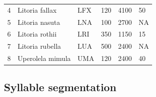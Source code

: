 \begin{table}[htb!]
{\begin{tabular}{llllll}
4            & Litoria fallax              & LFX                   & 120                                                                                 & 4100                                                                   & 50                                                                                   \\ 
5            & Litoria nasuta              & LNA                   & 100                                                                                 & 2700                                                                   & NA                                                                                   \\ 
6            & Litoria rothii              & LRI                   & 350                                                                                 & 1150                                                                   & 15                                                                                   \\ 
7            & Litoria rubella             & LUA                   & 500                                                                                 & 2400                                                                   & NA                                                                                   \\ 
8            & Uperolela mimula            & UMA                   & 120                                                                                 & 2400                                                                   & 40                                                                                   \\ \hline\hline
\end{tabular}
}
\end{table}




\subsection{Syllable segmentation}




